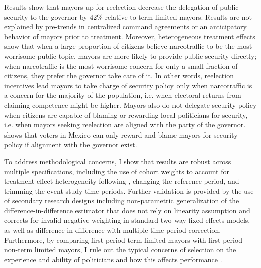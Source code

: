 Results show that mayors up for reelection decrease the delegation of public security to the governor by 42\% relative to term-limited mayors. Results are not explained by pre-trends in centralized command agreements or an anticipatory behavior of mayors prior to treatment. Moreover, heterogeneous treatment effects show that when a large proportion of citizens believe narcotraffic to be the most worrisome public topic, mayors are more likely to provide public security directly; when narcotraffic is the most worrisome concern for only a small fraction of citizens, they prefer the governor take care of it. In other words, reelection incentives lead mayors to take charge of security policy only when narcotraffic is a concern for the majority of the population, i.e. when electoral returns from claiming competence might be higher. Mayors also do not delegate security policy when citizens are capable of blaming or rewarding local politicians for security, i.e. when mayors seeking reelection are aligned with the party of the governor. \citet{ley_2017} shows that voters in Mexico can only reward and blame mayors for security policy if alignment with the governor exist. 

To address methodological concerns, I show that results are robust across multiple specifications, including the use of cohort weights to account for treatment effect heterogeneity following \citet{abraham_sun_2020}, changing the reference period, and trimming the event study time periods. Further validation is provided by the use of secondary research designs including \citet{imai_etal_2020} non-parametric generalization of the difference-in-difference estimator that does not rely on linearity assumption and corrects for invalid negative weighting in standard two-way fixed effects models, as well as \citet{chaisemarting_etal_2019} difference-in-difference with multiple time period correction. Furthermore, by comparing first period term limited mayors with first period non-term limited mayors, I rule out the typical concerns of selection on the experience and ability of politicians \citep{samuelson_1984, dalbo_etal_2017} and how this affects performance \citep{ferraz_finan_2011}. 

